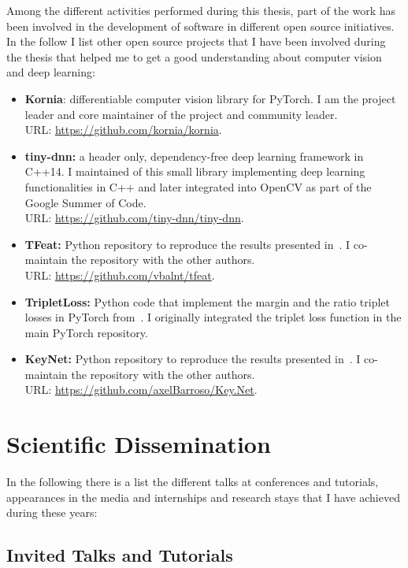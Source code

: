 Among the different activities performed during this thesis, part of the work has been involved in the development of software in different open source initiatives. In the follow I list other open source projects that I have been involved during the thesis that helped me to get a good understanding about computer vision and deep learning:

\begin{itemize}
\item \textbf{Kornia}: differentiable computer vision library for PyTorch. I am the project leader and core maintainer of the project and community leader.\\
URL: \url{https://github.com/kornia/kornia}.
\item \textbf{tiny-dnn:} a header only, dependency-free deep learning framework in C++14. I maintained of this small library implementing deep learning functionalities in C++ and later integrated into OpenCV as part of the Google Summer of Code.\\
URL: \url{https://github.com/tiny-dnn/tiny-dnn}.
\item \textbf{TFeat:} Python repository to reproduce the results presented in~\cite{BalntasBMVC2016}. I co-maintain the repository with the other authors.\\
URL: \url{https://github.com/vbalnt/tfeat}.
\item \textbf{TripletLoss:} Python code that implement the margin and the ratio triplet losses in PyTorch from~\cite{BalntasBMVC2016}. I originally integrated the triplet loss function in the main PyTorch repository.
\item \textbf{KeyNet:} Python repository to reproduce the results presented in~\cite{barroso2019keynet}. I co-maintain the repository with the other authors.\\
URL: \url{https://github.com/axelBarroso/Key.Net}.
\end{itemize}

\section{Scientific Dissemination}

In the following there is a list the different talks at conferences and tutorials, appearances in the media and internships and research stays that I have achieved during these years:

\subsection{Invited Talks and Tutorials}

